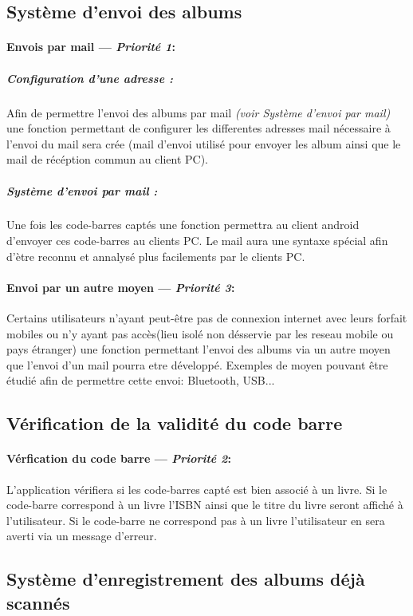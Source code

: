 \subsection{Système d'envoi des albums}
\paragraph{Envois par mail ---  \textit{Priorité 1}:}
\subparagraph{Configuration d'une adresse :}
Afin de permettre l'envoi des albums par mail \textit{(voir Système d'envoi par mail)} une fonction permettant de configurer les differentes adresses mail nécessaire à l'envoi du mail sera crée (mail d'envoi utilisé pour envoyer les album ainsi que le mail de récéption commun au client PC).

\subparagraph{Système d'envoi par mail :} 
Une fois les code-barres captés une fonction permettra au client android d'envoyer ces code-barres au clients PC. 
Le mail aura une syntaxe spécial afin d'ètre reconnu et annalysé plus facilements par le clients PC. 

\paragraph{Envoi par un autre moyen ---  \textit{Priorité 3}:}
Certains utilisateurs n'ayant peut-être pas de connexion internet avec leurs forfait mobiles ou n'y ayant pas accès(lieu isolé non désservie par les reseau mobile ou pays étranger) une fonction permettant l'envoi des albums via un autre moyen que l'envoi d'un mail pourra etre développé.
Exemples de moyen pouvant être étudié afin de permettre cette envoi: Bluetooth, USB...

\subsection{Vérification de la validité du code barre}
\paragraph{Vérfication du code barre ---  \textit{Priorité 2}:} 
L'application vérifiera si les code-barres capté est bien associé à un livre.
Si le code-barre correspond à un livre l'ISBN ainsi que le titre du livre seront affiché à l'utilisateur.
Si le code-barre ne correspond pas à un livre l'utilisateur en sera averti via un message d'erreur.

\subsection{Système d'enregistrement des albums déjà scannés}
